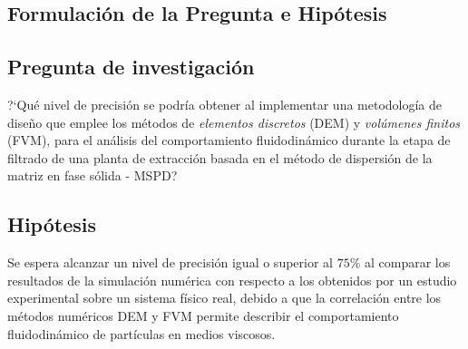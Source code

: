 \begin{center}
	\section{Formulaci\'on de la Pregunta e Hip\'otesis}
\end{center}

\subsection{Pregunta de investigaci\'on}

\noindent
\justify

?`Qu\'e nivel de precisi\'on se podr\'ia obtener al implementar una metodolog\'ia de dise\~no que emplee los m\'etodos de \textit{elementos discretos} (DEM) y \textit{vol\'umenes finitos} (FVM), para el an\'alisis del comportamiento fluidodin\'amico durante la etapa de filtrado de una planta de extracci\'on basada en el m\'etodo de dispersi\'on de la matriz en fase s\'olida - MSPD?

\subsection{Hip\'otesis}

\noindent
\justify

Se espera alcanzar un nivel de precisi\'on igual o superior al $75\%$ al comparar los resultados de la simulaci\'on num\'erica con respecto a los obtenidos por un estudio experimental sobre un sistema f\'isico real, debido a que la correlaci\'on entre los m\'etodos num\'ericos DEM y FVM permite describir el comportamiento fluidodin\'amico de part\'iculas en medios viscosos.